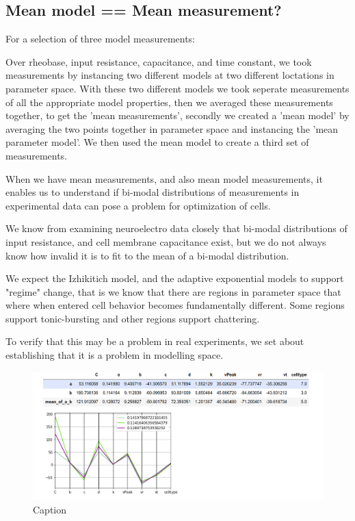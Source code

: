 \subsection{Mean model == Mean measurement?}
For a selection of three model measurements:

Over rheobase, input resistance, capacitance, and time constant, we took measurements by instancing two different models at  two different loctations in parameter space. With these two different models we took seperate measurements of all the appropriate model properties, then we averaged these measurements together, to get the 'mean measurements', secondly we created a 'mean model' by averaging the two points together in parameter space and instancing the 'mean parameter model'. We then used the mean model to create a third set of measurements.

When we have mean measurements, and also mean model measurements, it enables us to understand if bi-modal distributions of measurements in experimental data can pose a problem for optimization of cells.

We know from examining neuroelectro data closely that bi-modal distributions of input resistance, and cell membrane capacitance exist, but we do not always know how invalid it is to fit to the mean of a bi-modal distribution.

We expect the Izhikitich model, and the adaptive exponential models to support "regime" change, that is we know that there are regions in parameter space that where when entered cell behavior becomes fundamentally different. Some regions support tonic-bursting and other regions support chattering.

To verify that this may be a problem in real experiments, we set about establishing that it is a problem in modelling space.

\begin{figure}
    \centering
    \includegraphics{figures/mean_model_mean_measure_ment_params.png}
    \caption{Caption}
    \label{fig:my_label}
\end{figure}

